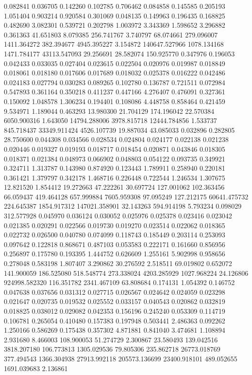 0.082841
0.036705
0.142260
0.102785
0.706462
0.084858
0.145585
0.205193
1.051404
0.903214
0.920584
0.301069
0.048135
0.149963
0.196435
0.168825
0.482690
3.082301
0.539721
0.202798
1.003972
3.343369
1.598652
3.296882
0.361363
41.651803
8.079385
256.741767
3.740797
68.074661
279.096007
1411.364272
382.394677
4945.395227
3.154872
140647.527966
1078.134168
1471.784177
43113.547093
29.256691
28.582074
150.925770
0.347976
0.196053
0.042433
0.033035
0.027404
0.023615
0.022504
0.020976
0.019987
0.018849
0.018061
0.018180
0.017606
0.017689
0.018032
0.025378
0.016222
0.042486
0.024183
0.027794
0.030283
0.089265
0.102780
0.136787
0.721511
0.072984
0.547893
0.361164
0.350218
0.411237
0.447166
4.276407
0.476091
0.327361
0.150092
1.048578
1.306234
0.194401
0.108086
4.448758
0.858464
0.421459
9.534971
1.189044
0.463293
13.980300
21.704129
174.196042
22.570384
6050.900316
1.643050
14794.288006
3978.815718
12444.784856
1.533737
845.718437
33349.911424
4526.107739
19.887034
43.085033
0.032896
0.282805
28.750600
0.044308
0.034566
0.028534
0.024804
0.024177
0.022138
0.021238
0.020446
0.019327
0.019193
0.018717
0.018454
0.020871
0.043846
0.018305
0.018371
0.021384
0.048973
0.066902
0.048803
0.054122
0.093735
0.349921
0.324711
1.313787
0.143980
0.874920
0.123443
1.789911
0.258940
0.220181
0.361421
1.379797
0.342178
1.468716
0.226448
0.722544
1.246534
1.307675
12.821520
1.854412
19.272663
47.222261
30.697724
127.001062
102.363456
66.059437
419.464128
657.999884
7605.959308
97.095249
127.212175
60641.475732
224.645387
1854.917312
147021.358901
32.143263
594.914198
5.793234
0.098029
312.577928
0.045970
0.036124
0.030052
0.025976
0.025378
0.023416
0.023042
0.021385
0.020291
0.022566
0.019730
0.019270
0.023514
0.022062
0.018365
0.022732
0.026500
0.040780
0.074099
0.118743
0.185449
0.203114
0.253093
0.097642
0.122818
0.868671
0.487103
0.053583
0.222171
0.161660
0.856956
0.256897
0.175780
0.193395
1.444752
0.626609
1.255161
5.902998
0.958656
0.278048
0.583198
1.807407
3.290862
30.276592
2.518511
69.019802
0.652072
141.900059
186.525080
518.548774
273.338024
4203.285929
1027.968224
24.126806
924998.582320
116.351782
2341.467109
63.808684
0.174131
1.054392
0.146752
0.047638
0.037656
0.031312
0.027715
0.026567
0.024642
0.024059
0.023298
0.021647
0.020735
0.019532
0.025552
0.033157
0.040543
0.020862
0.032819
0.018825
0.038012
0.029082
0.042353
0.156196
0.245240
0.053309
0.114719
0.106781
0.265054
0.410480
0.157383
0.197948
0.503441
2.486363
0.092262
1.250166
0.586269
0.175438
0.357302
4.871881
0.841040
3.474681
1.108894
2.931680
8.466003
108.900053
51.274729
2.300867
23.580493
139.042516
3818.207180
106.773813
1305.029536
79.805306
235.862718
26773.018769
377.494543
1366.304938
27913.992118
205573.136699
23400.918101
489.052655
1691.039683
2.136861
